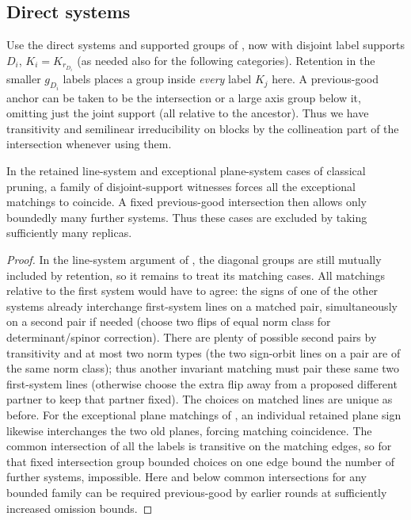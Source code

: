 \subsection{Direct systems}
\label{fa:direct-systems}

Use the direct systems and supported groups of
, now with disjoint label
supports \(D_i\), \(K_i=K_{r_{D_i}}\) (as needed also for the following categories). Retention in the
smaller \(g_{D_i}\) labels places a group inside \emph{every} label \(K_j\) here. A previous-good anchor can
be taken to be the intersection or a large axis group below it, omitting just the joint support (all
relative to the ancestor). Thus we have transitivity and semilinear irreducibility on blocks by the
collineation part of the intersection whenever using them.

\begin{lemma}\label{fa:direct-matchings}
In the retained line-system and exceptional plane-system cases of classical pruning, a family of
disjoint-support witnesses forces all the exceptional matchings to coincide.  A fixed previous-good
intersection then allows only boundedly many further systems.  Thus these cases are excluded by taking
sufficiently many replicas.
\end{lemma}

\begin{proof}

In the line-system argument of , the diagonal groups are still mutually included by
retention, so it remains to treat its matching cases. All matchings relative to the
first system would have to agree: the signs of one of the other systems already interchange first-system
lines on a matched pair, simultaneously on a second pair if needed (choose two flips of equal norm class
for determinant/spinor correction). There are plenty of possible second pairs by transitivity and at most
two norm types (the two sign-orbit lines on a pair are of the same norm class); thus another invariant
matching must pair these same two first-system lines (otherwise choose the extra flip away from a
proposed different partner to keep that partner fixed). The choices on matched lines are unique as
before. For the exceptional plane matchings of , an individual retained plane
sign likewise interchanges the
two old planes, forcing matching coincidence. The common intersection of all the labels is transitive on
the matching edges, so for that fixed intersection group bounded choices on one edge bound the number of
further systems, impossible. Here and below common intersections for any bounded family can be required
previous-good by earlier rounds at sufficiently increased omission bounds.

\end{proof}

